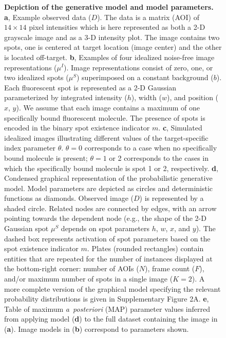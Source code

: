 \begin{figure} [t!]
\caption{\textbf{Depiction of the generative model and model parameters.} \textbf{a}, Example observed data ($D$). The data is a matrix (AOI) of $14 \times 14$ pixel intensities which is here represented as both a 2-D grayscale image and as a 3-D intensity plot. The image contains two spots, one is centered at target location (image center) and the other is located off-target. \textbf{b}, Examples of four idealized noise-free image representations ($\mu^I$). Image representations consist of zero, one, or two idealized spots ($\mu^S$) superimposed on a constant background ($b$). Each fluorescent spot is represented as a 2-D Gaussian parameterized by integrated intensity ($h$), width ($w$), and position ($x$, $y$). We assume that each image contains a maximum of one specifically bound fluorescent molecule. The presence of spots is encoded in the binary spot existence indicator $m$. \textbf{c}, Simulated idealized images illustrating different values of the target-specific index parameter $\theta$. $\theta = 0$ corresponds to a case when no specifically bound molecule is present; $\theta = 1$ or 2 corresponds to the cases in which the specifically bound molecule is spot 1 or 2, respectively. \textbf{d}, Condensed graphical representation of the probabilistic generative model. Model parameters are depicted as circles and deterministic functions as diamonds. Observed image ($D$) is represented by a shaded circle. Related nodes are connected by edges, with an arrow pointing towards the dependent node (e.g., the shape of the 2-D Gaussian spot $\mu^S$ depends on spot parameters $h$, $w$, $x$, and $y$). The dashed box represents activation of spot parameters based on the spot existence indicator $m$. Plates (rounded rectangles) contain entities that are repeated for the number of instances displayed at the bottom-right corner: number of AOIs ($N$), frame count ($F$), and/or maximum number of spots in a single image ($K=2$). A more complete version of the graphical model specifying the relevant probability distributions is given in Supplementary Figure 2A. \textbf{e}, Table of maximum \emph{a~posteriori} (MAP) parameter values inferred from applying model (\textbf{d}) to the full dataset containing the image in (\textbf{a}). Image models in (\textbf{b}) correspond to parameters shown. }
\end{figure}

